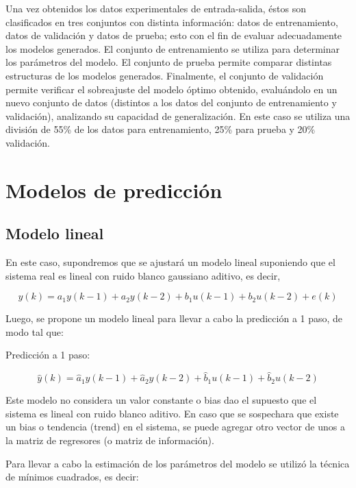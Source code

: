 \documentclass[12pt]{article}
\begin{document}
Una vez obtenidos los datos experimentales de entrada-salida, éstos son clasificados en tres conjuntos con distinta información: datos de entrenamiento, datos
de validación y datos de prueba; esto con el fin de evaluar adecuadamente los modelos
generados. El conjunto de entrenamiento se utiliza para determinar los parámetros del
modelo. El conjunto de prueba permite comparar distintas estructuras de los modelos
generados. Finalmente, el conjunto de validación permite verificar el sobreajuste del
modelo óptimo obtenido, evaluándolo en un nuevo conjunto de datos (distintos a los
datos del conjunto de entrenamiento y validación), analizando su capacidad de
generalización. En este caso se utiliza una división de 55\% de los datos para entrenamiento, 25\% para prueba y 20\% validación.

\section{Modelos de predicción}
\subsection{Modelo lineal}

En este caso, supondremos que se ajustará un modelo lineal suponiendo que el sistema real es lineal con ruido blanco gaussiano aditivo, es decir,


\begin{equation}
y(k)=a_1 y(k-1)+a_2 y(k-2)+b_1 u(k-1)+b_2 u(k-2)+e(k)
\label{e_ModeloLineal}
\end{equation}

Luego, se propone un modelo lineal para llevar a cabo la predicción a 1 paso, de modo tal que:

Predicción a 1 paso:

\begin{equation}
\hat{y}(k)=\hat{a}_1 y(k-1)+\hat{a}_2 y(k-2)+\hat{b}_1 u(k-1)+\hat{b}_2 u(k-2)
\label{e_Pre1paso}
\end{equation}

Este modelo no considera un valor constante o bias dao el supuesto que el sistema es lineal con ruido blanco aditivo. En caso que se sospechara que existe un bias o tendencia (trend) en el sistema, se puede agregar otro vector de unos a la matriz de regresores (o matriz de información).

Para llevar a cabo la estimación de los parámetros del modelo se utilizó la técnica de mínimos cuadrados, es decir:
\end{document}
